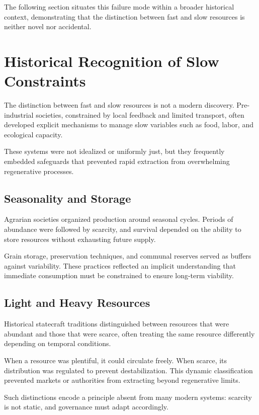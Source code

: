 \documentclass[12pt]{article} \usepackage[margin=1in]{geometry} \usepackage{setspace} \usepackage{amsmath,amssymb} \usepackage{hyperref}
\begin{document}
The following section situates this failure mode within a broader historical context, demonstrating that the distinction between fast and slow resources is neither novel nor accidental.

\section{Historical Recognition of Slow Constraints}

The distinction between fast and slow resources is not a modern discovery. Pre-industrial societies, constrained by local feedback and limited transport, often developed explicit mechanisms to manage slow variables such as food, labor, and ecological capacity.

These systems were not idealized or uniformly just, but they frequently embedded safeguards that prevented rapid extraction from overwhelming regenerative processes.

\subsection{Seasonality and Storage}

Agrarian societies organized production around seasonal cycles. Periods of abundance were followed by scarcity, and survival depended on the ability to store resources without exhausting future supply.

Grain storage, preservation techniques, and communal reserves served as buffers against variability. These practices reflected an implicit understanding that immediate consumption must be constrained to ensure long-term viability.

\subsection{Light and Heavy Resources}

Historical statecraft traditions distinguished between resources that were abundant and those that were scarce, often treating the same resource differently depending on temporal conditions.

When a resource was plentiful, it could circulate freely. When scarce, its distribution was regulated to prevent destabilization. This dynamic classification prevented markets or authorities from extracting beyond regenerative limits.

Such distinctions encode a principle absent from many modern systems: scarcity is not static, and governance must adapt accordingly.
\end{document}
